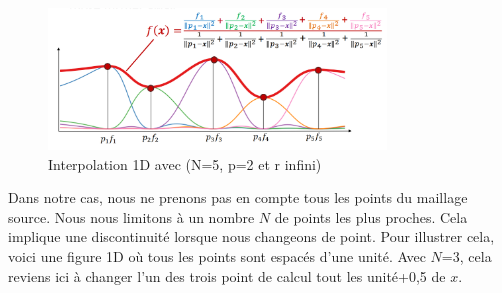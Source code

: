 
\vspace{0.5cm}

\begin{figure}[H]
    \centering
    \includegraphics[width=0.8\textwidth]{images/Inverse_Distance_Weighting.png}
    \caption{Interpolation 1D avec (N=5, p=2 et r infini)}
\end{figure}

\newpage

Dans notre cas, nous ne prenons pas en compte tous les points du maillage source. Nous nous limitons à un nombre \(N\) de points les plus proches. Cela implique une discontinuité lorsque nous changeons de point. Pour illustrer cela, voici une figure 1D où tous les points sont espacés d'une unité. Avec \(N\)=3, cela reviens ici à changer l'un des trois point de calcul tout les unité+0,5 de \(x\).

